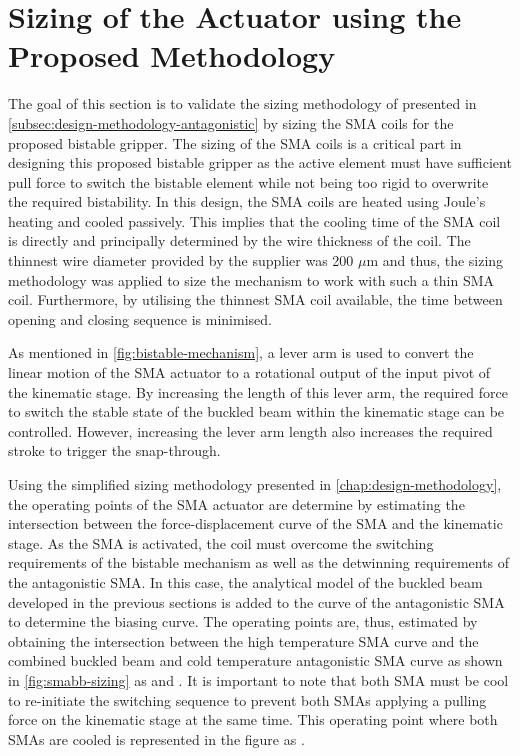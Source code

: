 \section{Sizing of the Actuator using the Proposed Methodology}
The goal of this section is to validate the sizing methodology of presented in \cref{subsec:design-methodology-antagonistic} by sizing the SMA coils for the proposed bistable gripper. The sizing of the SMA coils is a critical part in designing this proposed bistable gripper as the active element must have sufficient pull force to switch the bistable element while not being too rigid to overwrite the required bistability. In this design, the SMA coils are heated using Joule's heating and cooled passively. This implies that the cooling time of the SMA coil is directly and principally determined by the wire thickness of the coil. The thinnest wire diameter provided by the supplier was 200 $\mu$m and thus, the sizing methodology was applied to size the mechanism to work with such a thin SMA coil. Furthermore, by utilising the thinnest SMA coil available, the time between opening and closing sequence is minimised.

As mentioned in \cref{fig:bistable-mechanism}, a lever arm is used to convert the linear motion of the SMA actuator to a rotational output of the input pivot of the kinematic stage. By increasing the length of this lever arm, the required force to switch the stable state of the buckled beam within the kinematic stage can be controlled. However, increasing the lever arm length also increases the required stroke to trigger the snap-through.

Using the simplified sizing methodology presented in \cref{chap:design-methodology}, the operating points of the SMA actuator are determine by estimating the intersection between the force-displacement curve of the SMA and the kinematic stage. As the SMA is activated, the coil must overcome the switching requirements of the bistable mechanism as well as the detwinning requirements of the antagonistic SMA. In this case, the analytical model of the buckled beam developed in the previous sections is added to the curve of the antagonistic SMA to determine the biasing curve. The operating points are, thus, estimated by obtaining the intersection between the high temperature SMA curve and the combined buckled beam and cold temperature antagonistic SMA curve as shown in \cref{fig:smabb-sizing} as  and . It is important to note that both SMA must be cool to re-initiate the switching sequence to prevent both SMAs applying a pulling force on the kinematic stage at the same time. This operating point where both SMAs are cooled is represented in the figure as .

